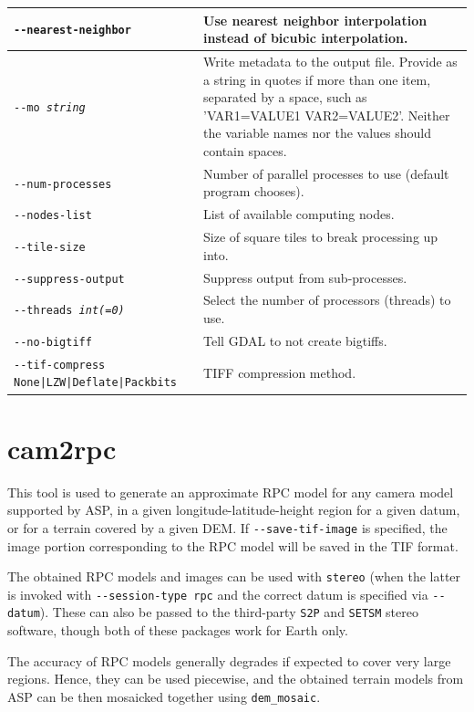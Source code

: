 \begin{longtable}{|l|p{9.5cm}|}
\texttt{-\/-nearest-neighbor} & Use nearest neighbor interpolation instead of bicubic interpolation.\\ \hline
\texttt{-\/-mo \textit{string}} & Write metadata to the output file. Provide as a string in quotes if more than one item, separated by a space, such as 'VAR1=VALUE1 VAR2=VALUE2'. Neither the variable names nor the values should contain spaces. \\ \hline
\texttt{-\/-num-processes} & Number of parallel processes to use (default program chooses).\\ \hline
\texttt{-\/-nodes-list} & List of available computing nodes.\\ \hline
\texttt{-\/-tile-size} & Size of square tiles to break processing up into.\\ \hline
\texttt{-\/-suppress-output} & Suppress output from sub-processes.\\ \hline
\texttt{-\/-threads \textit{int(=0)}} & Select the number of processors (threads) to use.\\ \hline
\texttt{-\/-no-bigtiff} & Tell GDAL to not create bigtiffs.\\ \hline
\texttt{-\/-tif-compress None|LZW|Deflate|Packbits} & TIFF compression method.\\ \hline
\end{longtable}

\clearpage

\section{cam2rpc}
\label{cam2rpc}

This tool is used to generate an approximate RPC model for any camera
model supported by ASP, in a given longitude-latitude-height region for
a given datum, or for a terrain covered by a given DEM. If
\texttt{-\/-save-tif-image} is specified, the image portion
corresponding to the RPC model will be saved in the TIF format. 

The obtained RPC models and images can be used with \texttt{stereo}
(when the latter is invoked with \texttt{-\/-session-type rpc} and the
correct datum is specified via \texttt{-\/-datum}). These can also be
passed to the third-party \texttt{S2P} and \texttt{SETSM} stereo
software, though both of these packages work for Earth only.

The accuracy of RPC models generally degrades if expected to cover
very large regions. Hence, they can be used piecewise, and
the obtained terrain models from ASP can be then mosaicked together
using \texttt{dem\_mosaic}.

